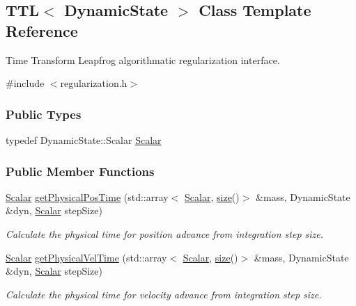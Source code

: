 \hypertarget{class_t_t_l}{}\subsection{T\+TL$<$ Dynamic\+State $>$ Class Template Reference}
\label{class_t_t_l}


Time Transform Leapfrog algorithmatic regularization interface.  




{\ttfamily \#include $<$regularization.\+h$>$}

\subsubsection*{Public Types}
\begin{DoxyCompactItemize}
\item 
typedef Dynamic\+State\+::\+Scalar \mbox{\hyperlink{class_t_t_l_a7eb23a1fca47fc7b81e69cbd948059e9}{Scalar}}
\end{DoxyCompactItemize}
\subsubsection*{Public Member Functions}
\begin{DoxyCompactItemize}
\item 
\mbox{\hyperlink{class_t_t_l_a7eb23a1fca47fc7b81e69cbd948059e9}{Scalar}} \mbox{\hyperlink{class_t_t_l_aedc11109f6e3cfd30203abb74cd906a2}{get\+Physical\+Pos\+Time}} (std\+::array$<$ \mbox{\hyperlink{class_t_t_l_a7eb23a1fca47fc7b81e69cbd948059e9}{Scalar}}, \mbox{\hyperlink{class_t_t_l_afec8947e7c6c18561be42e3dea30a04d}{size}}()$>$ \&mass, Dynamic\+State \&dyn, \mbox{\hyperlink{class_t_t_l_a7eb23a1fca47fc7b81e69cbd948059e9}{Scalar}} step\+Size)
\begin{DoxyCompactList}\small\item\em Calculate the physical time for position advance from integration step size. \end{DoxyCompactList}\item 
\mbox{\hyperlink{class_t_t_l_a7eb23a1fca47fc7b81e69cbd948059e9}{Scalar}} \mbox{\hyperlink{class_t_t_l_aceaf494a8e6af473703027241d4eaa41}{get\+Physical\+Vel\+Time}} (std\+::array$<$ \mbox{\hyperlink{class_t_t_l_a7eb23a1fca47fc7b81e69cbd948059e9}{Scalar}}, \mbox{\hyperlink{class_t_t_l_afec8947e7c6c18561be42e3dea30a04d}{size}}()$>$ \&mass, Dynamic\+State \&dyn, \mbox{\hyperlink{class_t_t_l_a7eb23a1fca47fc7b81e69cbd948059e9}{Scalar}} step\+Size)
\begin{DoxyCompactList}\small\item\em Calculate the physical time for velocity advance from integration step size. \end{DoxyCompactList}\end{DoxyCompactItemize}
